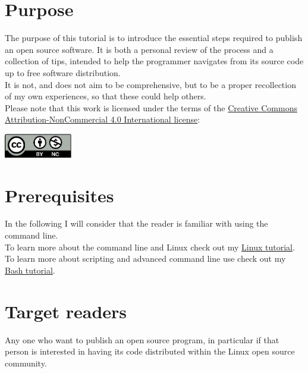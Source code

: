 \documentclass{./these-seb}
\begin{document}
\section*{Purpose}

The purpose of this tutorial is to introduce the essential steps required to publish an open source software. 
It is both a personal review of the process and a collection of tips, intended to help the programmer navigates from its source code up to free software distribution. \\
It is not, and does not aim to be comprehensive, but to be a proper recollection of my own experiences, so that these could help others. \\[0.25cm]
Please note that this work is licensed under the terms of the \href{https://creativecommons.org/licenses/by-nc/4.0/}{Creative Commons Attribution-NonCommercial 4.0 International license}: 
\begin{center}\includegraphics[width=3cm]{img/by-nc.eps}\end{center}

\section*{Prerequisites}

In the following I will consider that the reader is familiar with using the command line. \\
To learn more about the command line and Linux check out my \href{https://www.ipcms.fr/wp-content/uploads/2021/11/linux.pdf}{Linux tutorial}. \\
To learn more about scripting and advanced command line use check out my \href{https://www.ipcms.fr/wp-content/uploads/2021/05/bash.pdf}{Bash tutorial}. 

\section*{Target readers}

Any one who want to publish an open source program, in particular if that person is interested in having its code distributed within the Linux open source community. 

\newpage
\end{document}
